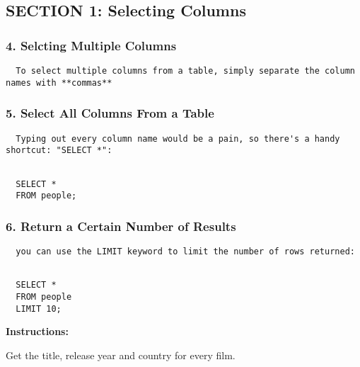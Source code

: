 \documentclass[
]{article}
\begin{document}
\hypertarget{section-1-selecting-columns}{%
\subsection{SECTION 1: Selecting
Columns}\label{section-1-selecting-columns}}

\hypertarget{selcting-multiple-columns}{%
\subsubsection{4. Selcting Multiple
Columns}\label{selcting-multiple-columns}}

\begin{verbatim}
  To select multiple columns from a table, simply separate the column names with **commas**
\end{verbatim}

\hypertarget{select-all-columns-from-a-table}{%
\subsubsection{5. Select All Columns From a
Table}\label{select-all-columns-from-a-table}}

\begin{verbatim}
  Typing out every column name would be a pain, so there's a handy shortcut: "SELECT *":    
  
\end{verbatim}

\begin{verbatim}
  SELECT * 
  FROM people;
\end{verbatim}

\hypertarget{return-a-certain-number-of-results}{%
\subsubsection{6. Return a Certain Number of
Results}\label{return-a-certain-number-of-results}}

\begin{verbatim}
  you can use the LIMIT keyword to limit the number of rows returned:  
  
\end{verbatim}

\begin{verbatim}
  SELECT *
  FROM people
  LIMIT 10;
\end{verbatim}

\textbf{Instructions:}

Get the title, release year and country for every film.
\end{document}
